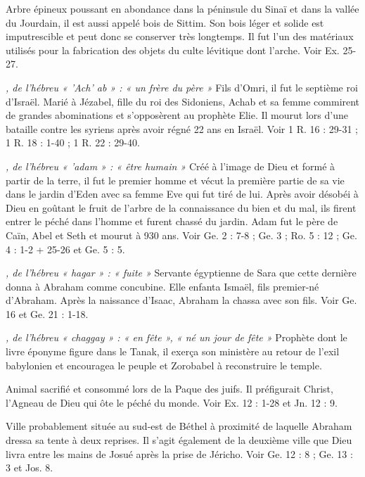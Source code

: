 \begin{multicols}{2}
\textit{}\newline
Arbre épineux poussant en abondance dans la péninsule du Sinaï et dans la vallée du Jourdain, il est aussi appelé bois de Sittim. Son bois léger et solide est imputrescible et peut donc se conserver très longtemps. Il fut l’un des matériaux utilisés pour la fabrication des objets du culte lévitique dont l’arche. Voir Ex. 25-27.

\textit{, de l'hébreu « 'Ach' ab » : « un frère du père »}\newline
Fils d'Omri, il fut le septième roi d'Israël. Marié à Jézabel, fille du roi des Sidoniens, Achab et sa femme commirent de grandes abominations et s’opposèrent au prophète Elie. Il mourut lors d'une bataille contre les syriens après avoir régné 22 ans en Israël. Voir 1 R. 16 : 29-31 ; 1 R. 18 : 1-40 ; 1 R. 22 : 29-40.

\textit{, de l'hébreu « 'adam » : « être humain »}\newline
Créé à l’image de Dieu et formé à partir de la terre, il fut le premier homme et vécut la première partie de sa vie dans le jardin d’Eden avec sa femme Eve qui fut tiré de lui. Après avoir désobéi à Dieu en goûtant le fruit de l'arbre de la connaissance du bien et du mal, ils firent entrer le péché dans l’homme et furent chassé du jardin. Adam fut le père de Caïn, Abel et Seth et mourut à 930 ans. Voir Ge. 2 : 7-8 ; Ge. 3 ; Ro. 5 : 12 ; Ge. 4 : 1-2 + 25-26 et Ge. 5 : 5.

\textit{, de l'hébreu « hagar » : « fuite »}\newline
Servante égyptienne de Sara que cette dernière donna à Abraham comme concubine. Elle enfanta Ismaël, fils premier-né d’Abraham. Après la naissance d’Isaac, Abraham la chassa avec son fils. Voir Ge. 16 et Ge. 21 : 1-18.

\textit{, de l'hébreu « chaggay » : « en fête », « né un jour de fête »}\newline
Prophète dont le livre éponyme figure dans le Tanak, il exerça son ministère au retour de l'exil babylonien et encouragea le peuple et Zorobabel à reconstruire le temple.

\textit{}\newline
Animal sacrifié et consommé lors de la Paque des juifs. Il préfigurait Christ, l'Agneau de Dieu qui ôte le péché du monde. Voir Ex. 12 : 1-28 et Jn. 12 : 9.

\textit{}\newline
Ville probablement située au sud-est de Béthel à proximité de laquelle Abraham dressa sa tente à deux reprises. Il s’agit également de la deuxième ville que Dieu livra entre les mains de Josué après la prise de Jéricho. Voir Ge. 12 : 8 ; Ge. 13 : 3 et Jos. 8.


\end{multicols}
